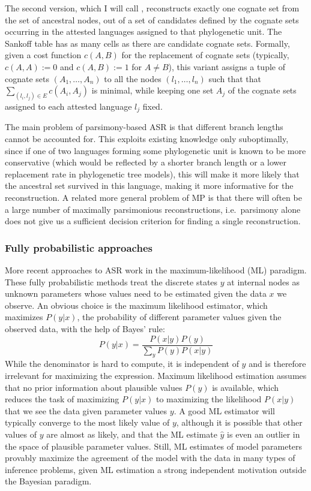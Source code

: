 The second version, which I will call \textit{}, reconstructs exactly one cognate set from the set of ancestral nodes, out of a set of candidates defined by the cognate sets occurring in the attested languages assigned to that phylogenetic unit. The Sankoff table has as many cells as there are candidate cognate sets. Formally, given a cost function $c(A,B)$ for the replacement of cognate sets (typically, $c(A,A) := 0$ and $c(A,B) := 1$ for $A \neq B$), this variant assigns a tuple of cognate sets $(A_1,\dots,A_n)$ to all the nodes $(l_1,\dots,l_n)$ such that that $\sum_{(l_i,l_j) \in E} c(A_i,A_j)$ is minimal, while keeping one set $A_j$ of the cognate sets  assigned to each attested language $l_j$ fixed.

The main problem of parsimony-based ASR is that different branch lengths cannot be accounted for. This exploits existing knowledge only suboptimally, since if one of two languages forming some phylogenetic unit is known to be more conservative (which would be reflected by a shorter branch length or a lower replacement rate in phylogenetic tree models), this will make it more likely that the ancestral set survived in this language, making it more informative for the reconstruction. A related more general problem of MP is that there will often be a large number of maximally parsimonious reconstructions, i.e.\ parsimony alone does not give us a sufficient decision criterion for finding a single reconstruction.

\subsubsection{Fully probabilistic approaches}
More recent approaches to ASR work in the maximum-likelihood (ML) paradigm. These fully probabilistic methods treat the discrete states $y$ at internal nodes as unknown parameters whose values need to be estimated given the data $x$ we observe. An obvious choice is the maximum likelihood estimator, which maximizes $P(y|x)$, the probability of different parameter values given the observed data, with the help of Bayes' rule:
\begin{equation}
 P(y|x) = \frac{P(x|y)P(y)}{\sum_y P(y)P(x|y)}
\end{equation}
While the denominator is hard to compute, it is independent of $y$ and is therefore irrelevant for maximizing the expression. Maximum likelihood estimation assumes that no prior information about plausible values $P(y)$ is available, which reduces the task of maximizing $P(y|x)$ to maximizing the likelihood $P(x|y)$ that we see the data given parameter values $y$. A good ML estimator will typically converge to the most likely value of $y$, although it is possible that other values of $y$ are almost as likely, and that the ML estimate $\hat{y}$ is even an outlier in the space of plausible parameter values. Still, ML estimates of model parameters provably maximize the agreement of the model with the data in many types of inference problems, given ML estimation a strong independent motivation outside the Bayesian paradigm.

